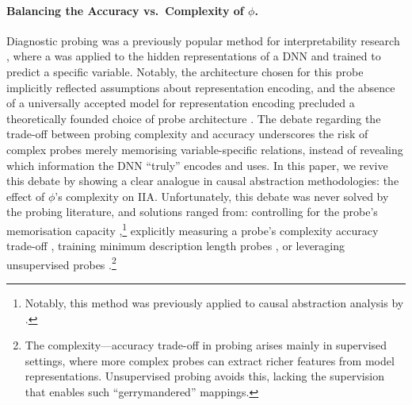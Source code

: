 \documentclass{article}
\newcommand{\causalmap}{\phi}
\begin{document}
\vspace{-2pt}
\paragraph{Balancing the Accuracy vs.\ Complexity of $\causalmap$.} 
Diagnostic probing was a previously popular method for interpretability research \citep{alain2018understanding}, where a  was applied to the hidden representations of a DNN and trained to predict a specific variable.
Notably, the architecture chosen for this probe implicitly reflected assumptions about representation encoding, and the absence of a universally accepted model for representation encoding precluded a theoretically founded choice of probe architecture \citep{belinkov-2022-probing}.
The debate regarding the trade-off between probing complexity and accuracy \citep{hewitt-liang-2019-designing, pimentel-etal-2020-information, pimentel-etal-2020-pareto,voita-titov-2020-information} underscores the risk of complex probes merely memorising variable-specific relations, instead of revealing which information the DNN ``truly'' encodes and uses.
In this paper, we revive this debate by showing a clear analogue in causal abstraction methodologies: the effect of $\causalmap$'s complexity on IIA.
Unfortunately, this debate was never solved by the probing literature, and solutions ranged from:
controlling for the probe's memorisation capacity \citep{hewitt-liang-2019-designing},\footnote{Notably, this method was previously applied to causal abstraction analysis by \citet{arora-etal-2024-causalgym}.}
explicitly measuring a probe's complexity accuracy trade-off \citep{pimentel-etal-2020-pareto},
training minimum description length probes \citep{voita-titov-2020-information}, or leveraging unsupervised probes \citep{burns2023discovering}.\footnote{The complexity---accuracy trade-off in probing arises mainly in supervised settings, where more complex probes can extract richer features from model representations. Unsupervised probing avoids this, lacking the supervision that enables such ``gerrymandered'' mappings.}

\vspace{-1pt}
\end{document}
